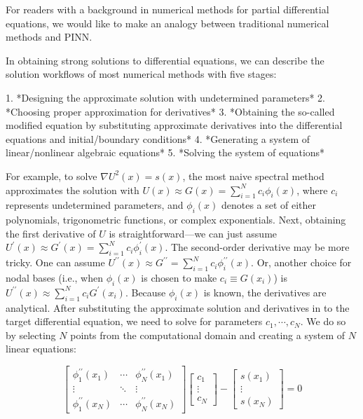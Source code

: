 
For readers with a background in numerical methods for partial differential equations, we would like to make an analogy between traditional numerical methods and PINN.

In obtaining strong solutions to differential equations, we can describe the solution workflows of most numerical methods with five stages:

1. *Designing the approximate solution with undetermined parameters*
2. *Choosing proper approximation for derivatives*
3. *Obtaining the so-called modified equation by substituting approximate derivatives into the differential equations and initial/boundary conditions*
4. *Generating a system of linear/nonlinear algebraic equations*
5. *Solving the system of equations*

For example, to solve $\nabla U^2(x)=s(x)$, the most naive spectral method \cite{trefethen_spectral_2000} approximates the solution with $U(x)\approx G(x)=\sum\limits_{i=1}^{N}c_i\phi_i(x)$, where $c_i$ represents undetermined parameters, and $\phi_i(x)$ denotes a set of either polynomials, trigonometric functions, or complex exponentials.
Next, obtaining the first derivative of $U$ is straightforward—we can just assume $U^{\prime}(x)\approx G^{\prime}(x)=\sum\limits_{i=1}^{N}c_i \phi_i^{\prime}(x)$.
The second-order derivative may be more tricky.
One can assume $U^{\prime\prime}(x)\approx G^{\prime\prime}=\sum\limits_{i=1}^{N}c_i \phi_i^{\prime\prime}(x)$.
Or, another choice for nodal bases (i.e., when $\phi_i(x)$ is chosen to make $c_i\equiv G(x_i)$) is $U^{\prime\prime}(x)\approx \sum\limits_{i=1}^{N}c_i G^{\prime}(x_i)$.
Because $\phi_i(x)$ is known, the derivatives are analytical.
After substituting the approximate solution and derivatives in to the target differential equation, we need to solve for parameters $c_1,\cdots,c_N$.
We do so by selecting $N$ points from the computational domain and creating a system of $N$ linear equations:

\begin{equation}\label{eq:spectral-linear-sys}
    \begin{bmatrix}
        \phi_1^{\prime\prime}(x_1) & \cdots & \phi_N^{\prime\prime}(x_1) \\
        \vdots & \ddots & \vdots \\
        \phi_1^{\prime\prime}(x_N) & \cdots & \phi_N^{\prime\prime}(x_N)
    \end{bmatrix}
    \begin{bmatrix}
        c_1 \\ \vdots \\ c_N
    \end{bmatrix}
    - 
    \begin{bmatrix}
        s(x_1) \\ \vdots \\ s(x_N)
    \end{bmatrix}
    = 0
\end{equation}

